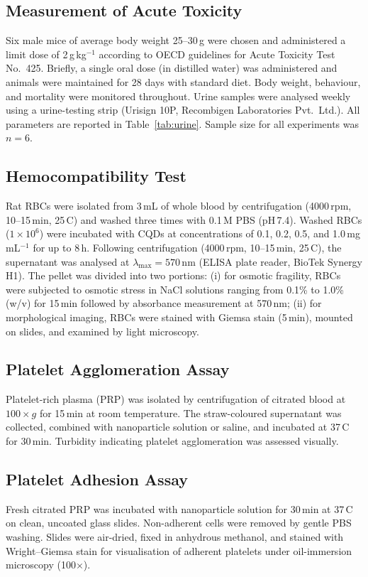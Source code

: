 \subsection*{Measurement of Acute Toxicity}
Six male mice of average body weight 25--30\,g were chosen and administered a limit dose
of 2\,g\,kg$^{-1}$ according to OECD guidelines for Acute Toxicity Test No.~425.
Briefly, a single oral dose (in distilled water) was administered and animals were
maintained for 28 days with standard diet. Body weight, behaviour, and mortality were
monitored throughout. Urine samples were analysed weekly using a urine-testing strip
(Urisign 10P, Recombigen Laboratories Pvt.\ Ltd.). All parameters are reported in
Table~\ref{tab:urine}. Sample size for all experiments was $n = 6$.

\subsection*{Hemocompatibility Test}
Rat RBCs were isolated from 3\,mL of whole blood by centrifugation
(4000\,rpm, 10--15\,min, 25\,\textdegree C) and washed three times with 0.1\,M PBS
(pH\,7.4). Washed RBCs ($1 \times 10^{6}$) were incubated with CQDs at concentrations
of 0.1, 0.2, 0.5, and 1.0\,mg\,mL$^{-1}$ for up to 8\,h. Following centrifugation
(4000\,rpm, 10--15\,min, 25\,\textdegree C), the supernatant was analysed at
$\lambda_{\max} = 570$\,nm (ELISA plate reader, BioTek Synergy H1). The pellet was
divided into two portions: (i) for osmotic fragility, RBCs were subjected to osmotic
stress in NaCl solutions ranging from 0.1\% to 1.0\% (w/v) for 15\,min followed by
absorbance measurement at 570\,nm; (ii) for morphological imaging, RBCs were stained
with Giemsa stain (5\,min), mounted on slides, and examined by light microscopy.

\subsection*{Platelet Agglomeration Assay}
Platelet-rich plasma (PRP) was isolated by centrifugation of citrated blood at
$100 \times g$ for 15\,min at room temperature. The straw-coloured supernatant was
collected, combined with nanoparticle solution or saline, and incubated at 37\,\textdegree C
for 30\,min. Turbidity indicating platelet agglomeration was assessed visually.

\subsection*{Platelet Adhesion Assay}
Fresh citrated PRP was incubated with nanoparticle solution for 30\,min at
37\,\textdegree C on clean, uncoated glass slides. Non-adherent cells were removed by
gentle PBS washing. Slides were air-dried, fixed in anhydrous methanol, and stained with
Wright--Giemsa stain for visualisation of adherent platelets under oil-immersion
microscopy (100$\times$).

